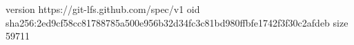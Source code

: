 version https://git-lfs.github.com/spec/v1
oid sha256:2ed9cf58cc81788785a500e956b32d34fc3c81bd980ffbfe1742f3f30c2afdeb
size 59711
